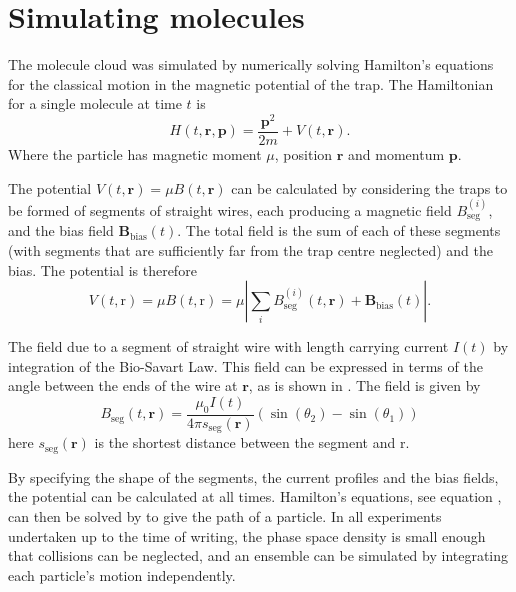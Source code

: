 \section{Simulating molecules}

The molecule cloud was simulated by numerically solving Hamilton's equations
for the classical motion in the magnetic potential of the trap. The Hamiltonian
for a single molecule at time $t$ is
%
\begin{equation}
  H(t, \mathbf{r}, \mathbf{p}) = \frac{\mathbf{p}^2}{2m} + V(t, \mathbf{r}).
\end{equation}
Where the particle has magnetic moment $\mu$, position $\mathbf{r}$ and
momentum $\mathbf{p}$.

The potential $V(t, \mathbf{r}) = \mu B(t, \mathbf{r})$ can be calculated by
considering the traps to be formed of segments of straight wires, each
producing a magnetic field $B_\text{seg}^{(i)}$, and the bias field
$\mathbf{B}_\text{bias}(t)$. The total field is the sum of each of these
segments (with segments that are sufficiently far from the trap centre
neglected) and the bias. The potential is therefore
%
\begin{equation}
  V(t, \mathrm{r}) = \mu B (t, \mathrm{r}) = \mu \left| \sum_i
  B_\text{seg}^{(i)}(t, \mathbf{r}) +
  \mathbf{B}_\text{bias}(t)\right|.
\end{equation}

The field due to a segment of straight wire with length carrying current $I(t)$
 by integration of the Bio-Savart Law.
This field can be expressed in terms of the angle between the ends of the wire
at $\mathbf{r}$, as is shown in . The field
is given by~\cite{Griffiths2017}
%
\begin{equation}
  B_\text{seg}(t, \mathbf{r}) = \frac{\mu_0 I(t)}{4\pi
  s_\text{seg}(\mathbf{r})} (\sin(\theta_2)  - \sin(\theta_1))
\end{equation}
here $s_\text{seg}(\mathbf{r})$ is the shortest distance between the segment
and $\mathrm{r}$.

By specifying the shape of the segments, the current profiles and the bias
fields, the potential can be calculated at all times. Hamilton's equations, see
equation , can then be solved by  to give the path of a
particle. In all \CaF experiments undertaken up to the time of writing, the
phase space density is small enough that collisions can be neglected, and an
ensemble can be simulated by integrating each particle's motion independently.

